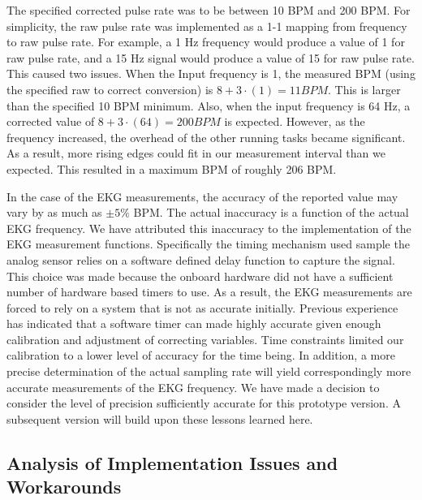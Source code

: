 \documentclass[12pt]{article} %
\begin{document}
    The specified corrected pulse rate was to be between 10 BPM and 200 BPM.
    For simplicity, the raw pulse rate was implemented as a 1-1 mapping from
    frequency to raw pulse rate.  For example, a 1 Hz frequency would produce a
    value of 1 for raw pulse rate, and a 15 Hz signal would produce a value of
    15 for raw pulse rate.  This caused two issues.  When the Input frequency
    is 1, the measured BPM (using the specified raw to correct conversion) is
    $8 + 3\cdot(1) = 11 BPM$.  This is larger than the specified 10 BPM
    minimum.  Also, when the input frequency is 64 Hz, a corrected value of 
    $8 + 3\cdot(64) = 200 BPM$ is expected.  However, as the frequency
    increased, the overhead of the other running tasks became significant.
    As a result, more rising edges could fit in our measurement interval
    than we expected.  This resulted in a maximum BPM of roughly 206 BPM.

		In the case of the EKG measurements, the accuracy of the reported value may
		vary by as much as $  \pm 5\%$ BPM. The actual inaccuracy is a function of the
		actual EKG frequency. We have attributed this inaccuracy to the
		implementation of the EKG measurement functions. Specifically the timing
		mechanism used sample the analog sensor relies on a software defined delay
		function to capture the signal. This choice was made because the onboard
		hardware did not have a sufficient number of hardware based timers to use.
		As a result, the EKG measurements are forced to rely on a system that is
		not as accurate initially. Previous experience has indicated that a
		software timer can made highly accurate given enough calibration and
		adjustment of correcting variables. Time constraints limited our
		calibration to a lower level of accuracy for the time being. In addition, a
		more precise determination of the actual sampling rate will yield
		correspondingly more accurate measurements of the EKG frequency. We have
		made a decision to consider the level of precision sufficiently accurate
		for this prototype version. A subsequent version will build upon these
		lessons learned here.

    \subsection{Analysis of Implementation Issues and Workarounds}

\end{document}
